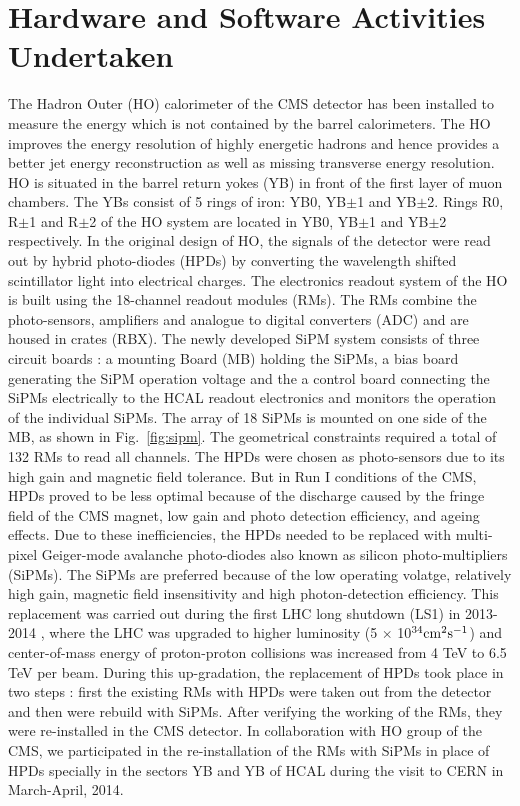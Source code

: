 \chapter{Hardware and Software Activities Undertaken}
\label{chap:Hardware}

The Hadron Outer (HO) calorimeter of the CMS detector has been installed to measure the energy which is not contained by the barrel calorimeters. The HO improves the energy resolution of highly energetic hadrons and hence provides a better jet energy reconstruction as well as missing transverse energy resolution. HO is situated in the barrel return yokes (YB) in front of the first layer of muon chambers. The YBs consist of 5 rings of iron: YB0, YB$\pm$1 and YB$\pm$2. Rings R0, R$\pm$1 and R$\pm$2 of the HO system are located in YB0, YB$\pm$1 and YB$\pm$2 respectively. In the original design of HO, the signals of the detector were read out by hybrid photo-diodes (HPDs) by converting the wavelength shifted scintillator light into electrical charges. The electronics readout system of the HO is built using the 18-channel readout modules (RMs). The RMs combine the photo-sensors, amplifiers and analogue to digital converters (ADC) and are housed in crates (RBX). The newly developed SiPM system consists of three circuit boards : a mounting Board (MB) holding the SiPMs, a bias board generating the SiPM operation voltage and the a control board connecting the SiPMs electrically to the HCAL readout electronics and monitors the operation of the individual SiPMs. The array of 18 SiPMs is mounted on one side of the MB, as shown in Fig.~\ref{fig:sipm}. The geometrical constraints required a total of 132 RMs to read all channels. The HPDs were chosen as photo-sensors due to its high gain and magnetic field tolerance. But in Run I conditions of the CMS, HPDs proved to be less optimal because of the discharge caused by the fringe field of the CMS magnet, low gain and photo detection efficiency, and ageing effects. Due to these inefficiencies, the HPDs needed to be replaced with multi-pixel Geiger-mode avalanche photo-diodes also known as silicon photo-multipliers (SiPMs). The SiPMs are preferred because of the low operating volatge, relatively high gain, magnetic field insensitivity and high photon-detection efficiency. This replacement was carried out during the first LHC long shutdown (LS1) in 2013-2014 \cite{Lutz:2012yoa}, where the LHC was upgraded to higher luminosity (5 $\times$ 10$^{34} {\rm cm}^2 {\rm s}^{-1}$) and center-of-mass energy of proton-proton collisions was increased from 4 TeV to 6.5 TeV per beam. During this up-gradation, the replacement of HPDs took place in two steps : first the existing RMs with HPDs were taken out from the detector and then were rebuild with SiPMs. After verifying the working of the RMs, they were re-installed in the CMS detector. In collaboration with HO group of the CMS, we participated in the re-installation of the RMs with SiPMs in place of HPDs specially in the sectors YB and YB of HCAL during the visit to CERN in March-April, 2014.

